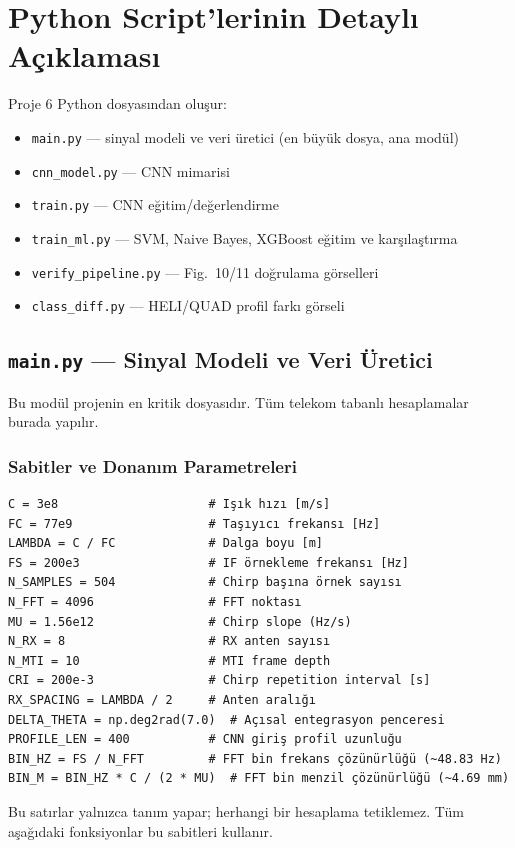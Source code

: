 \documentclass[11pt,a4paper]{article}
\begin{document}
\section{Python Script'lerinin Detaylı Açıklaması}
Proje 6 Python dosyasından oluşur:
\begin{itemize}
    \item \texttt{main.py} — sinyal modeli ve veri üretici (en büyük dosya, ana modül)
    \item \texttt{cnn\_model.py} — CNN mimarisi
    \item \texttt{train.py} — CNN eğitim/değerlendirme
    \item \texttt{train\_ml.py} — SVM, Naive Bayes, XGBoost eğitim ve karşılaştırma
    \item \texttt{verify\_pipeline.py} — Fig.~10/11 doğrulama görselleri
    \item \texttt{class\_diff.py} — HELI/QUAD profil farkı görseli
\end{itemize}

\subsection{\texttt{main.py} — Sinyal Modeli ve Veri Üretici}
Bu modül projenin en kritik dosyasıdır. Tüm telekom tabanlı hesaplamalar burada yapılır.

\subsubsection{Sabitler ve Donanım Parametreleri}
\begin{lstlisting}[caption={Table I parametreleri}]
C = 3e8                     # Işık hızı [m/s]
FC = 77e9                   # Taşıyıcı frekansı [Hz]
LAMBDA = C / FC             # Dalga boyu [m]
FS = 200e3                  # IF örnekleme frekansı [Hz]
N_SAMPLES = 504             # Chirp başına örnek sayısı
N_FFT = 4096                # FFT noktası
MU = 1.56e12                # Chirp slope (Hz/s)
N_RX = 8                    # RX anten sayısı
N_MTI = 10                  # MTI frame depth
CRI = 200e-3                # Chirp repetition interval [s]
RX_SPACING = LAMBDA / 2     # Anten aralığı
DELTA_THETA = np.deg2rad(7.0)  # Açısal entegrasyon penceresi
PROFILE_LEN = 400           # CNN giriş profil uzunluğu
BIN_HZ = FS / N_FFT         # FFT bin frekans çözünürlüğü (~48.83 Hz)
BIN_M = BIN_HZ * C / (2 * MU)  # FFT bin menzil çözünürlüğü (~4.69 mm)
\end{lstlisting}
Bu satırlar yalnızca tanım yapar; herhangi bir hesaplama tetiklemez. Tüm aşağıdaki fonksiyonlar
bu sabitleri kullanır.
\end{document}
